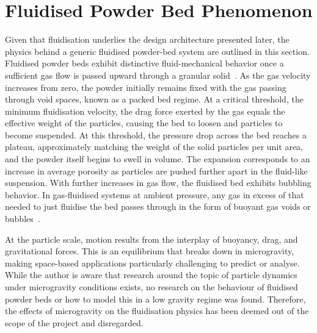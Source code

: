 \section{Fluidised Powder Bed Phenomenon}
Given that fluidisation underlies the design architecture presented later, the physics behind a generic fluidised powder-bed system are outlined in this section.
Fluidised powder beds exhibit distinctive fluid-mechanical behavior once a sufficient gas flow is passed upward through a granular solid~\cite{KuniiLevenspiel1977}. As the gas velocity increases from zero, the powder initially remains fixed with the gas passing through void spaces, known as a packed bed regime. At a critical threshold, the minimum fluidisation velocity, the drag force exerted by the gas equals the effective weight of the particles, causing the bed to loosen and particles to become suspended. At this threshold, the pressure drop across the bed reaches a plateau, approximately matching the weight of the solid particles per unit area, and the powder itself begins to swell in volume. The expansion corresponds to an increase in average porosity as particles are pushed further apart in the fluid-like suspension. With further increases in gas flow, the fluidised bed exhibits bubbling behavior. In gas-fluidised systems at ambient pressure, any gas in excess of that needed to just fluidise the bed passes through in the form of buoyant gas voids or bubbles~\cite{SHENG2022137168}.

At the particle scale, motion results from the interplay of buoyancy, drag, and gravitational forces. This is an equilibrium that breaks down in microgravity, making space-based applications particularly challenging to predict or analyse. While the author is aware that research around the topic of particle dynamics under microgravity conditions exists, no research on the behaviour of fluidised powder beds or how to model this in a low gravity regime was found. Therefore, the effects of microgravity on the fluidisation physics has been deemed out of the scope of the project and disregarded.


